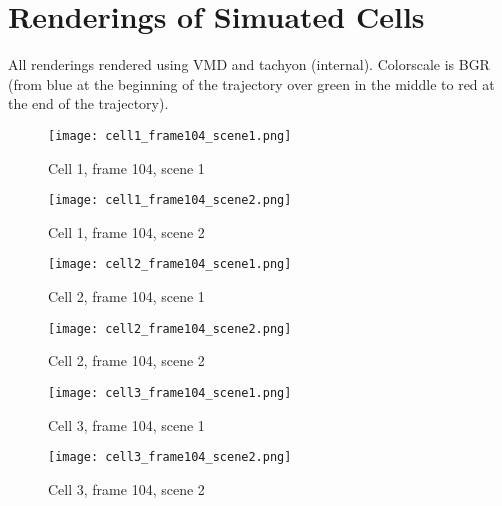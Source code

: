 
\chapter{Renderings of Simuated Cells} %
\label{cha:renderings_of_simuated_cells}

\newcommand{\cellrenderingwidth}{8cm}
\newcommand{\cellrenderingheight}{8cm}

All renderings rendered using VMD\cite{humphrey_vmd_1996} and tachyon\cite{stone_em_1998} (internal). Colorscale is BGR (from blue at the beginning of the trajectory over green in the middle to red at the end of the trajectory).

\begin{figure}[H]
\centering
  \texttt{[image: cell1\_frame104\_scene1.png]}
  \caption{Cell 1, frame 104, scene 1}
  \label{img:cell1_frame104_scene1}
\end{figure}

\begin{figure}[H]
\centering
  \texttt{[image: cell1\_frame104\_scene2.png]}
  \caption{Cell 1, frame 104, scene 2}
  \label{img:cell1_frame104_scene2}
\end{figure}

\begin{figure}[H]
\centering
  \texttt{[image: cell2\_frame104\_scene1.png]}
  \caption{Cell 2, frame 104, scene 1}
  \label{img:cell2_frame104_scene1}
\end{figure}

\begin{figure}[H]
\centering
  \texttt{[image: cell2\_frame104\_scene2.png]}
  \caption{Cell 2, frame 104, scene 2}
  \label{img:cell2_frame104_scene2}
\end{figure}

\begin{figure}[H]
\centering
  \texttt{[image: cell3\_frame104\_scene1.png]}
  \caption{Cell 3, frame 104, scene 1}
  \label{img:cell3_frame104_scene1}
\end{figure}

\begin{figure}[H]
\centering
  \texttt{[image: cell3\_frame104\_scene2.png]}
  \caption{Cell 3, frame 104, scene 2}
  \label{img:cell3_frame104_scene2}
\end{figure}

